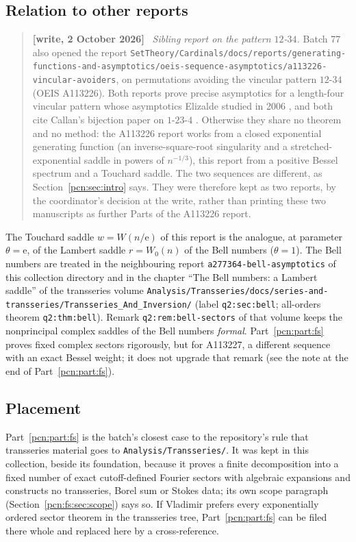 \documentclass[11pt,letterpaper]{article}
\theoremstyle{remark}\newtheorem{remark}[theorem]{Remark}
\newcommand{\ee}{\mathrm e}
\newenvironment{writenote}{\par\smallskip\begin{quote}\small\textbf{[write, 2 October 2026]}\ }{\end{quote}\smallskip}
\newcommand{\repopath}[1]{\nolinkurl{#1}}
\begin{document}
\subsection*{Relation to other reports}
\label{pcn:guide:relations}
\begin{writenote}
\emph{Sibling report on the pattern $12$-$34$.} Batch 77 also opened the report \repopath{SetTheory/Cardinals/docs/reports/generating-functions-and-asymptotics/oeis-sequence-asymptotics/a113226-vincular-avoiders}, on permutations avoiding the vincular pattern $12$-$34$ (OEIS A113226). Both reports prove precise asymptotics for a length-four vincular pattern whose asymptotics Elizalde studied in 2006 \cite{Elizalde}, and both cite Callan's bijection paper on $1$-$23$-$4$ \cite{Callan}. Otherwise they share no theorem and no method: the A113226 report works from a closed exponential generating function (an inverse-square-root singularity and a stretched-exponential saddle in powers of $n^{-1/3}$), this report from a positive Bessel spectrum and a Touchard saddle. The two sequences are different, as Section~\ref{pcn:sec:intro} says. They were therefore kept as two reports, by the coordinator's decision at the write, rather than printing these two manuscripts as further Parts of the A113226 report.
\end{writenote}
The Touchard saddle $w=W(n/\ee)$ of this report is the analogue, at parameter $\theta=\ee$, of the Lambert saddle $r=W_0(n)$ of the Bell numbers ($\theta=1$). The Bell numbers are treated in the neighbouring report \repopath{a277364-bell-asymptotics} of this collection directory and in the chapter ``The Bell numbers: a Lambert saddle'' of the transseries volume \repopath{Analysis/Transseries/docs/series-and-transseries/Transseries_And_Inversion/} (label \texttt{q2:sec:bell}; all-orders theorem \texttt{q2:thm:bell}). Remark \texttt{q2:rem:bell-sectors} of that volume keeps the nonprincipal complex saddles of the Bell numbers \emph{formal}. Part~\ref{pcn:part:fs} proves fixed complex sectors rigorously, but for A113227, a different sequence with an exact Bessel weight; it does not upgrade that remark (see the note at the end of Part~\ref{pcn:part:fs}).

\subsection*{Placement}
\label{pcn:guide:placement}
Part~\ref{pcn:part:fs} is the batch's closest case to the repository's rule that transseries material goes to \repopath{Analysis/Transseries/}. It was kept in this collection, beside its foundation, because it proves a finite decomposition into a fixed number of exact cutoff-defined Fourier sectors with algebraic expansions and constructs no transseries, Borel sum or Stokes data; its own scope paragraph (Section~\ref{pcn:fs:sec:scope}) says so. If Vladimir prefers every exponentially ordered sector theorem in the transseries tree, Part~\ref{pcn:part:fs} can be filed there whole and replaced here by a cross-reference.
\end{document}
